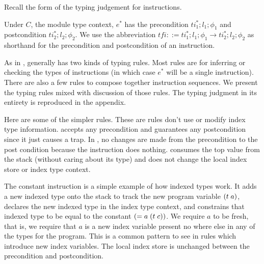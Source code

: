 Recall the form of the \name typing judgement for instructions.
\begin{mathpar}
\end{mathpar}

Under $C$, the module type context, $e^{*}$ has the precondition $ti_1^{*};l_1;\phi_1$ and postcondition $ti_2^{*};l_2;\phi_2$.
We use the abbreviation $tfi ::= ti_1^{*};l_1;\phi_1 \rightarrow ti_2^{*};l_2;\phi_2$ as shorthand for the precondition and postcondition of an instruction.

As in \wasm, \name generally has two kinds of typing rules.
Most rules are for inferring or checking the types of instructions (in which case $e^{*}$ will be a single instruction).
There are also a few rules to compose together instruction sequences.
We present the typing rules mixed with discussion of those rules.
The typing judgment in its entirety is reproduced in the appendix.

Here are some of the simpler rules.
These are rules don't use or modify index type information.
 accepts any precondition and guarantees any postcondition since it just causes a trap.
In , no changes are made from the precondition to the post condition because the instruction does nothing.
 consumes the top value from the stack (without caring about its type) and does not change the local index store or index type context.
\begin{mathpar}


\end{mathpar}

The constant instruction is a simple example of how indexed types work.
It adds a new indexed type onto the stack to track the new program variable $\ti{t}{a}$, declares the new indexed type in the index type context, and constrains that indexed type to be equal to the constant $(= a\; \ti{t}{c})$.
We require $a$ to be fresh, that is, we require that $a$ is a new index variable present no where else in any of the types for the program.
This is a common pattern to see in rules which introduce new index variables.
The local index store is unchanged between the precondition and postcondition.
\begin{mathpar}
\end{mathpar}

